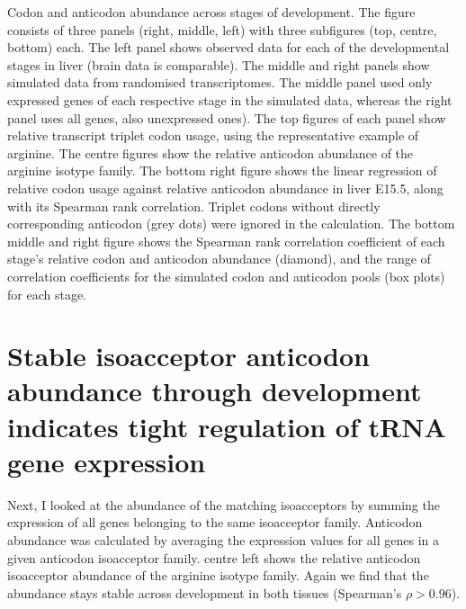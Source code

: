     {Codon and anticodon abundance across stages of development.}
    {The figure consists of three panels (right, middle, left) with three
    subfigures (top, centre, bottom) each. The left panel shows observed data
    for each of the developmental stages in liver (brain data is comparable).
    The middle and right panels show simulated data from randomised
    transcriptomes. The middle panel used only expressed genes of each
    respective stage in the simulated data, whereas the right panel uses all
    genes, also unexpressed ones). The top figures of each panel show relative
    \mrna transcript triplet codon usage, using the representative example of
    arginine. The centre figures show the relative \trna anticodon abundance of
    the arginine isotype family. The bottom right figure shows the linear
    regression of relative codon usage against relative anticodon abundance in
    liver E15.5, along with its Spearman rank correlation. Triplet codons
    without directly corresponding anticodon (grey dots) were ignored in the
    calculation. The bottom middle and right figure shows the Spearman rank
    correlation coefficient of each stage’s relative codon and anticodon
    abundance (diamond), and the range of correlation coefficients for the
    simulated codon and anticodon pools (box plots) for each stage.}

\section{Stable isoacceptor anticodon abundance through development indicates
tight regulation of tRNA gene expression}

Next, I looked at the abundance of the matching \trna isoacceptors by summing
the expression of all \trna genes belonging to the same isoacceptor family.
Anticodon abundance was calculated by averaging the expression values for all
\trna genes in a given anticodon isoacceptor family.
 centre left shows the relative anticodon
isoacceptor abundance of the arginine isotype family. Again we find that the
abundance stays stable across development in both tissues (Spearman’s \(\rho >
0.96\)).

